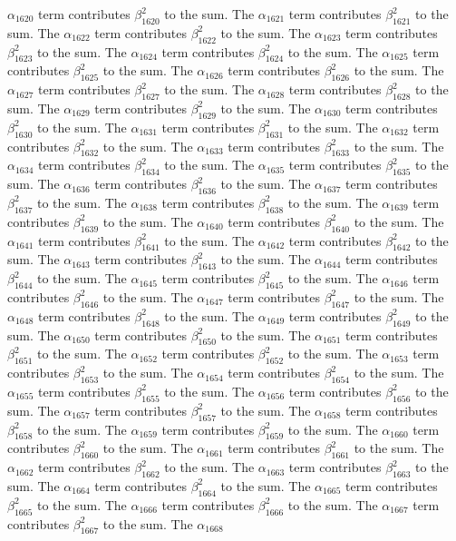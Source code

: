 \begin{lemma}
$\alpha_{1620}$ term contributes $\beta_{1620}^{2}$ to the sum. The $\alpha_{1621}$ term contributes $\beta_{1621}^{2}$ to the sum. The $\alpha_{1622}$ term contributes $\beta_{1622}^{2}$ to the sum. The $\alpha_{1623}$ term contributes $\beta_{1623}^{2}$ to the sum. The $\alpha_{1624}$ term contributes $\beta_{1624}^{2}$ to the sum. The $\alpha_{1625}$ term contributes $\beta_{1625}^{2}$ to the sum. The $\alpha_{1626}$ term contributes $\beta_{1626}^{2}$ to the sum. The $\alpha_{1627}$ term contributes $\beta_{1627}^{2}$ to the sum. The $\alpha_{1628}$ term contributes $\beta_{1628}^{2}$ to the sum. The $\alpha_{1629}$ term contributes $\beta_{1629}^{2}$ to the sum. The $\alpha_{1630}$ term contributes $\beta_{1630}^{2}$ to the sum. The $\alpha_{1631}$ term contributes $\beta_{1631}^{2}$ to the sum. The $\alpha_{1632}$ term contributes $\beta_{1632}^{2}$ to the sum. The $\alpha_{1633}$ term contributes $\beta_{1633}^{2}$ to the sum. The $\alpha_{1634}$ term contributes $\beta_{1634}^{2}$ to the sum. The $\alpha_{1635}$ term contributes $\beta_{1635}^{2}$ to the sum. The $\alpha_{1636}$ term contributes $\beta_{1636}^{2}$ to the sum. The $\alpha_{1637}$ term contributes $\beta_{1637}^{2}$ to the sum. The $\alpha_{1638}$ term contributes $\beta_{1638}^{2}$ to the sum. The $\alpha_{1639}$ term contributes $\beta_{1639}^{2}$ to the sum. The $\alpha_{1640}$ term contributes $\beta_{1640}^{2}$ to the sum. The $\alpha_{1641}$ term contributes $\beta_{1641}^{2}$ to the sum. The $\alpha_{1642}$ term contributes $\beta_{1642}^{2}$ to the sum. The $\alpha_{1643}$ term contributes $\beta_{1643}^{2}$ to the sum. The $\alpha_{1644}$ term contributes $\beta_{1644}^{2}$ to the sum. The $\alpha_{1645}$ term contributes $\beta_{1645}^{2}$ to the sum. The $\alpha_{1646}$ term contributes $\beta_{1646}^{2}$ to the sum. The $\alpha_{1647}$ term contributes $\beta_{1647}^{2}$ to the sum. The $\alpha_{1648}$ term contributes $\beta_{1648}^{2}$ to the sum. The $\alpha_{1649}$ term contributes $\beta_{1649}^{2}$ to the sum. The $\alpha_{1650}$ term contributes $\beta_{1650}^{2}$ to the sum. The $\alpha_{1651}$ term contributes $\beta_{1651}^{2}$ to the sum. The $\alpha_{1652}$ term contributes $\beta_{1652}^{2}$ to the sum. The $\alpha_{1653}$ term contributes $\beta_{1653}^{2}$ to the sum. The $\alpha_{1654}$ term contributes $\beta_{1654}^{2}$ to the sum. The $\alpha_{1655}$ term contributes $\beta_{1655}^{2}$ to the sum. The $\alpha_{1656}$ term contributes $\beta_{1656}^{2}$ to the sum. The $\alpha_{1657}$ term contributes $\beta_{1657}^{2}$ to the sum. The $\alpha_{1658}$ term contributes $\beta_{1658}^{2}$ to the sum. The $\alpha_{1659}$ term contributes $\beta_{1659}^{2}$ to the sum. The $\alpha_{1660}$ term contributes $\beta_{1660}^{2}$ to the sum. The $\alpha_{1661}$ term contributes $\beta_{1661}^{2}$ to the sum. The $\alpha_{1662}$ term contributes $\beta_{1662}^{2}$ to the sum. The $\alpha_{1663}$ term contributes $\beta_{1663}^{2}$ to the sum. The $\alpha_{1664}$ term contributes $\beta_{1664}^{2}$ to the sum. The $\alpha_{1665}$ term contributes $\beta_{1665}^{2}$ to the sum. The $\alpha_{1666}$ term contributes $\beta_{1666}^{2}$ to the sum. The $\alpha_{1667}$ term contributes $\beta_{1667}^{2}$ to the sum. The $\alpha_{1668}$ 
\end{lemma}
